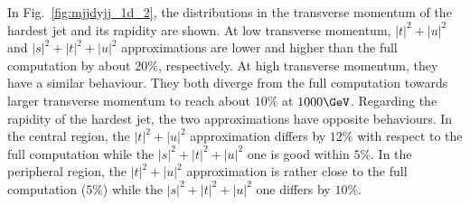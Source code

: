 In Fig.~\ref{fig:mjjdyjj_1d_2}, the distributions in the transverse momentum of the hardest jet and its rapidity are shown.
At low transverse momentum, $|t|^2+|u|^2$ and $|s|^2+|t|^2+|u|^2$ approximations are lower and higher than the full computation by about $20\%$, respectively.
At high transverse momentum, they have a similar behaviour.
They both diverge from the full computation towards larger transverse momentum to reach about $10\%$ at $1000\GeV$.
Regarding the rapidity of the hardest jet, the two approximations have opposite behaviours.
In the central region, the $|t|^2+|u|^2$ approximation differs by $12\%$ with respect to the full computation while the $|s|^2+|t|^2+|u|^2$ one is good within $5\%$.
In the peripheral region, the $|t|^2+|u|^2$ approximation is rather close to the full computation ($5\%$) while the $|s|^2+|t|^2+|u|^2$ one differs by $10\%$.

